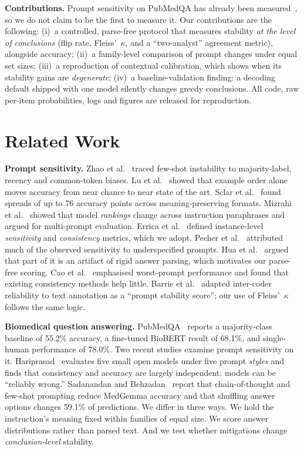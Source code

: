 \documentclass[acmsmall,nonacm]{acmart}
\begin{document}
\noindent\textbf{Contributions.} Prompt sensitivity on PubMedQA has already been measured~\cite{hariprasad2026clinical,sadanandan2026cot}, so we do not claim to be the first to measure it. Our contributions are the following:
(i)~a controlled, parse-free protocol that measures stability \emph{at the level of conclusions} (flip rate, Fleiss'~$\kappa$, and a ``two-analyst'' agreement metric), alongside accuracy;
(ii)~a family-level comparison of prompt changes under equal set sizes;
(iii)~a reproduction of contextual calibration, which shows when its stability gains are \emph{degenerate};
(iv)~a baseline-validation finding: a decoding default shipped with one model silently changes greedy conclusions.
All code, raw per-item probabilities, logs and figures are released for reproduction.

\section{Related Work}
\label{sec:related}

\textbf{Prompt sensitivity.} Zhao et al.~\cite{zhao2021calibrate} traced few-shot instability to majority-label, recency and common-token biases. Lu et al.~\cite{lu2022fantastically} showed that example order alone moves accuracy from near chance to near state of the art. Sclar et al.~\cite{sclar2024formatting} found spreads of up to 76 accuracy points across meaning-preserving formats. Mizrahi et al.~\cite{mizrahi2024stateofwhatart} showed that model \emph{rankings} change across instruction paraphrases and argued for multi-prompt evaluation. Errica et al.~\cite{errica2025sensitivity} defined instance-level \emph{sensitivity} and \emph{consistency} metrics, which we adopt. Pecher et al.~\cite{pecher2026underspecification} attributed much of the observed sensitivity to underspecified prompts. Hua et al.~\cite{hua2025flaw} argued that part of it is an artifact of rigid answer parsing, which motivates our parse-free scoring. Cao et al.~\cite{cao2024worst} emphasised worst-prompt performance and found that existing consistency methods help little. Barrie et al.~\cite{barrie2024pss} adapted inter-coder reliability to text annotation as a ``prompt stability score''; our use of Fleiss'~$\kappa$ follows the same logic.

\textbf{Biomedical question answering.} PubMedQA~\cite{jin2019pubmedqa} reports a majority-class baseline of 55.2\% accuracy, a fine-tuned BioBERT result of 68.1\%, and single-human performance of 78.0\%. Two recent studies examine prompt sensitivity on it. Hariprasad~\cite{hariprasad2026clinical} evaluates five small open models under five prompt \emph{styles} and finds that consistency and accuracy are largely independent: models can be ``reliably wrong.'' Sadanandan and Behzadan~\cite{sadanandan2026cot} report that chain-of-thought and few-shot prompting reduce MedGemma accuracy and that shuffling answer options changes 59.1\% of predictions. We differ in three ways. We hold the instruction's meaning fixed within families of equal size. We score answer distributions rather than parsed text. And we test whether mitigations change \emph{conclusion-level} stability.
\end{document}

